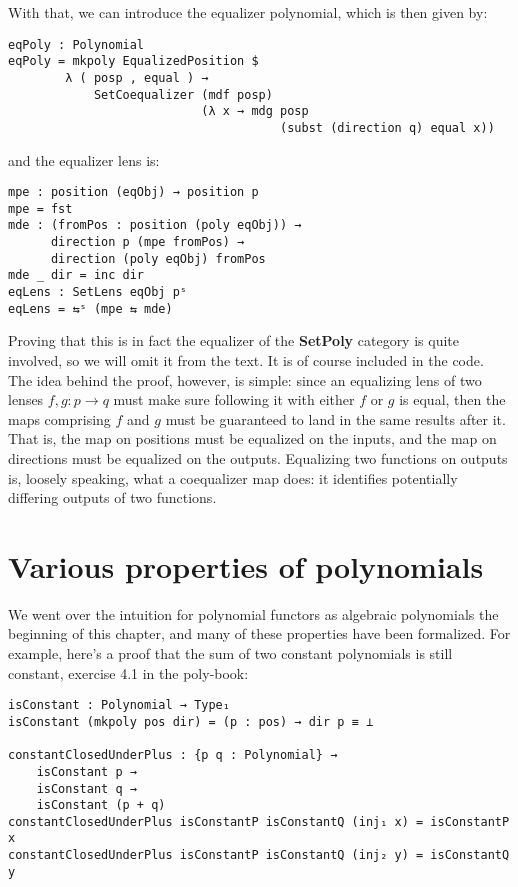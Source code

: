 With that, we can introduce the equalizer polynomial, which is then given by:
\begin{verbatim}
eqPoly : Polynomial
eqPoly = mkpoly EqualizedPosition $ 
        λ ( posp , equal ) → 
            SetCoequalizer (mdf posp) 
                           (λ x → mdg posp 
                                      (subst (direction q) equal x))
\end{verbatim}
and the equalizer lens is:
\begin{verbatim}
mpe : position (eqObj) → position p
mpe = fst
mde : (fromPos : position (poly eqObj)) → 
      direction p (mpe fromPos) → 
      direction (poly eqObj) fromPos
mde _ dir = inc dir
eqLens : SetLens eqObj pˢ
eqLens = ⇆ˢ (mpe ⇆ mde)
\end{verbatim}

Proving that this is in fact the equalizer of the \textbf{SetPoly} category is quite involved, so we will omit it from the text. It is of course included in the code. The idea behind the proof, however, is simple: since an equalizing lens of two lenses $f,g : p \rightarrow q$ must make sure following it with either $f$ or $g$ is equal, then the maps comprising $f$ and $g$ must be guaranteed to land in the same results after it. That is, the map on positions must be equalized on the inputs, and the map on directions must be equalized on the outputs. Equalizing two functions on outputs is, loosely speaking, what a coequalizer map does: it identifies potentially differing outputs of two functions.

\section{Various properties of polynomials}

We went over the intuition for polynomial functors as algebraic polynomials the beginning of this chapter, and many of these properties have been formalized. For example, here's a proof that the sum of two constant polynomials is still constant, exercise 4.1 in the poly-book:

\begin{verbatim}
isConstant : Polynomial → Type₁
isConstant (mkpoly pos dir) = (p : pos) → dir p ≡ ⊥

constantClosedUnderPlus : {p q : Polynomial} → 
    isConstant p → 
    isConstant q → 
    isConstant (p + q)
constantClosedUnderPlus isConstantP isConstantQ (inj₁ x) = isConstantP x
constantClosedUnderPlus isConstantP isConstantQ (inj₂ y) = isConstantQ y
\end{verbatim}

